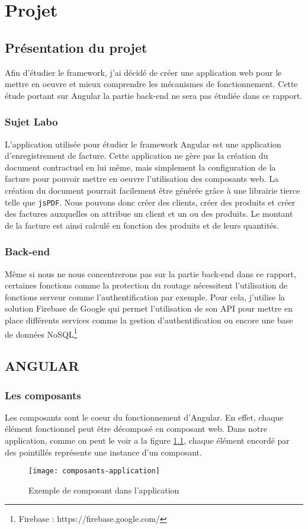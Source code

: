 \chapter{Projet}

\section{Présentation du projet}
Afin d'étudier le framework, j'ai décidé de créer une application web pour le mettre en oeuvre et mieux comprendre les mécanismes de fonctionnement. Cette étude portant sur Angular la partie back-end ne sera pas étudiée dans ce rapport.
\subsection{Sujet Labo}
L'application utilisée pour étudier le framework Angular est une application d'enregistrement de facture. Cette application ne gère pas la création du document contractuel en lui même, mais simplement la configuration de la facture pour pouvoir mettre en oeuvre l'utilisation des composants web. La création du document pourrait facilement être générée grâce à une librairie tierce telle que \texttt{jsPDF}\cite{github:jsPDF}. Nous pouvons donc créer des clients, créer des produits et créer des factures auxquelles on attribue un client et un ou des produits. Le montant de la facture est ainsi calculé en fonction des produits et de leurs quantités.
\subsection{Back-end}

Même si nous ne nous concentrerons pas sur la partie back-end dans ce rapport, certaines fonctions comme la protection du routage nécessitent l'utilisation de fonctions serveur comme l'authentification par exemple. Pour cela, j'utilise la solution Firebase de Google qui permet l'utilisation de son API pour mettre en place différents services comme la gestion d'authentification ou encore une base de données NoSQL\footnote{Firebase : https://firebase.google.com/}

\section{ANGULAR}
\subsection{Les composants}
Les composants sont le coeur du fonctionnement d'Angular. En effet, chaque élément fonctionnel peut être décomposé en composant web. Dans notre application, comme on peut le voir a la figure \ref{composant-app}, chaque élément encordé par des pointillés représente une instance d'un composant.
\begin{figure}[h]
	\centering
	\texttt{[image: composants-application]}
	\caption{Exemple de composant dans l'application}
	\label{composant-app}
\end{figure}
